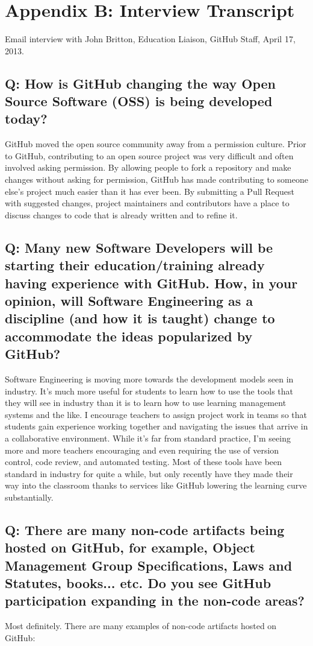 \clearpage

\section*{Appendix B: Interview Transcript}
Email interview with John Britton, Education Liaison, GitHub Staff, April 17, 2013.

\subsection*{Q: How is GitHub changing the way Open Source Software (OSS) is being developed today?}
GitHub moved the open source community away from a permission culture. Prior to GitHub, contributing to an open source project was very difficult and often involved asking permission. By allowing people to fork a repository and make changes without asking for permission, GitHub has made contributing to someone else's project much easier than it has ever been. By submitting a Pull Request with suggested changes, project maintainers and contributors have a place to discuss changes to code that is already written and to refine it.

\subsection*{Q: Many new Software Developers will be starting their education/training already having experience with GitHub. How, in your opinion, will Software Engineering as a discipline (and how it is taught) change to accommodate the ideas popularized by GitHub?}

Software Engineering is moving more towards the development models seen in industry. It's much more useful for students to learn how to use the tools that they will see in industry than it is to learn how to use learning management systems and the like. I encourage teachers to assign project work in teams so that students gain experience working together and navigating the issues that arrive in a collaborative environment. While it's far from standard practice, I'm seeing more and more teachers encouraging and even requiring the use of version control, code review, and automated testing. Most of these tools have been standard in industry for quite a while, but only recently have they made their way into the classroom thanks to services like GitHub lowering the learning curve substantially.

\subsection*{Q: There are many non-code artifacts being hosted on GitHub, for example, Object Management Group Specifications, Laws and Statutes, books... etc. Do you see GitHub participation expanding in the non-code areas?}
Most definitely. There are many examples of non-code artifacts hosted on GitHub:

